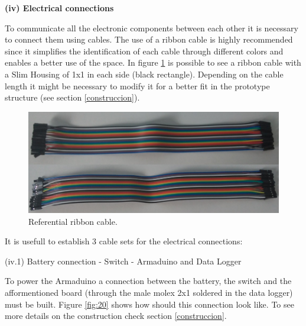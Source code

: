 \documentclass[12pt,letterpaper]{article}
\numberwithin{figure}{section}
\numberwithin{equation}{section}
\numberwithin{table}{section}
\begin{document}
\begin{flushleft}
\textbf{(iv) Electrical connections}
\end{flushleft}

To communicate all the electronic components between each other it is necessary to connect them using cables. The use of a ribbon cable is highly recommended since it simplifies the identification of each cable through different colors and enables a better use of the space. In figure \ref{fig:19} is possible to see a ribbon cable with a Slim Housing of 1x1 in each side (black rectangle). Depending on the cable length it might be necessary to modify it for a better fit in the prototype structure (see section \ref{construccion}).

\begin{figure}[H]
    \centering
    \includegraphics[scale=0.5]{Figuras/figure_19.jpg}
    \caption{Referential ribbon cable.}
    \label{fig:19}
\end{figure}

It is usefull to establish 3 cable sets for the electrical connections:

\begin{flushleft}
(iv.1) Battery connection - Switch - Armaduino and Data Logger
\end{flushleft}

To power the Armaduino a connection between the battery, the switch and the afformentioned board (through the male molex 2x1 soldered in the data logger) must be built. Figure \ref{fig:20} shows how should this connection look like. To see more details on the construction check section \ref{construccion}.
\end{document}
